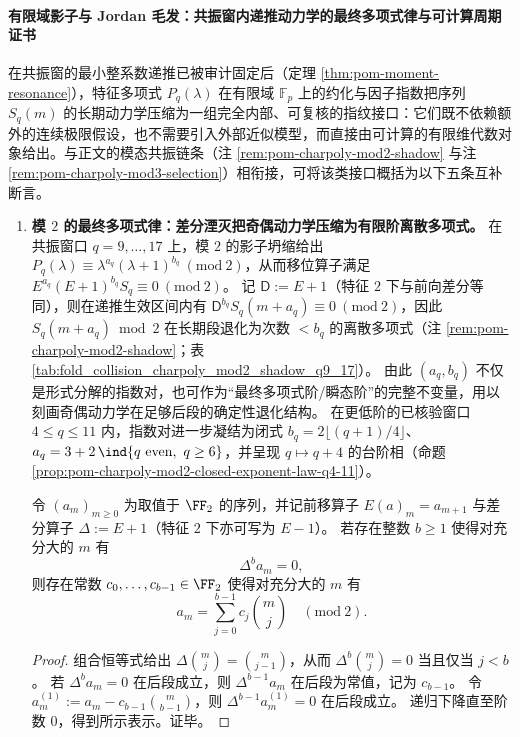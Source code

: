\paragraph{有限域影子与 Jordan 毛发：共振窗内递推动力学的最终多项式律与可计算周期证书}
在共振窗的最小整系数递推已被审计固定后（定理 \ref{thm:pom-moment-resonance}），特征多项式 \(P_q(\lambda)\) 在有限域 \(\mathbb{F}_p\) 上的约化与因子指数把序列 \(S_q(m)\) 的长期动力学压缩为一组完全内部、可复核的指纹接口：它们既不依赖额外的连续极限假设，也不需要引入外部近似模型，而直接由可计算的有限维代数对象给出。与正文的模态共振链条（注 \ref{rem:pom-charpoly-mod2-shadow} 与注 \ref{rem:pom-charpoly-mod3-selection}）相衔接，可将该类接口概括为以下五条互补断言。
\begin{enumerate}
  \item \textbf{模 \texorpdfstring{$2$}{2} 的最终多项式律：差分湮灭把奇偶动力学压缩为有限阶离散多项式。}
  在共振窗口 \(q=9,\dots,17\) 上，模 \(2\) 的影子坍缩给出
  \(P_q(\lambda)\equiv \lambda^{a_q}(\lambda+1)^{b_q}\ (\mathrm{mod}\ 2)\)，从而移位算子满足
  \(E^{a_q}(E+1)^{b_q}S_q\equiv 0\ (\mathrm{mod}\ 2)\)。
  记 \(\mathsf{D}:=E+1\)（特征 \(2\) 下与前向差分等同），则在递推生效区间内有
  \(\mathsf{D}^{b_q}S_q(m+a_q)\equiv 0\ (\mathrm{mod}\ 2)\)，因此 \(S_q(m+a_q)\bmod 2\) 在长期段退化为次数 \(<b_q\) 的离散多项式（注 \ref{rem:pom-charpoly-mod2-shadow}；表 \ref{tab:fold_collision_charpoly_mod2_shadow_q9_17}）。
  由此 \((a_q,b_q)\) 不仅是形式分解的指数对，也可作为“最终多项式阶/瞬态阶”的完整不变量，用以刻画奇偶动力学在足够后段的确定性退化结构。
  在更低阶的已核验窗口 \(4\le q\le 11\) 内，指数对进一步凝结为闭式
  \(b_q=2\lfloor (q+1)/4\rfloor\)、\(a_q=3+2\,\ind\{q\ \mathrm{even},\ q\ge 6\}\)，并呈现 \(q\mapsto q+4\) 的台阶相（命题 \ref{prop:pom-charpoly-mod2-closed-exponent-law-q4-11}）。

  \begin{proposition}[\(\FF_2\) 上差分幂零所强制的二项式基多项式性]\label{prop:conclusion-f2-binomial-basis-from-delta-nilpotent}
  令 \((a_m)_{m\ge 0}\) 为取值于 \(\FF_2\) 的序列，并记前移算子 \(E(a)_m=a_{m+1}\) 与差分算子 \(\Delta:=E+1\)（特征 \(2\) 下亦可写为 \(E-1\)）。
  若存在整数 \(b\ge 1\) 使得对充分大的 \(m\) 有
  \[
  \Delta^{b}a_m=0,
  \]
  则存在常数 \(c_0,\dots,c_{b-1}\in\FF_2\) 使得对充分大的 \(m\) 有
  \[
  a_m=\sum_{j=0}^{b-1}c_j\binom{m}{j}\quad(\mathrm{mod}\ 2).
  \]
  \end{proposition}

  \begin{proof}
  组合恒等式给出 \(\Delta\binom{m}{j}=\binom{m}{j-1}\)，从而 \(\Delta^b\binom{m}{j}=0\) 当且仅当 \(j<b\)。
  若 \(\Delta^b a_m=0\) 在后段成立，则 \(\Delta^{b-1}a_m\) 在后段为常值，记为 \(c_{b-1}\)。
  令 \(a^{(1)}_m:=a_m-c_{b-1}\binom{m}{b-1}\)，则 \(\Delta^{b-1}a^{(1)}_m=0\) 在后段成立。
  递归下降直至阶数 \(0\)，得到所示表示。证毕。
  \end{proof}


\end{enumerate}
